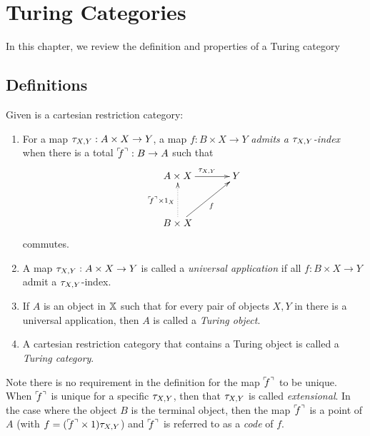\chapter{Turing Categories} %
\label{chap:turing_categories}

In this chapter, we review the definition and properties of a Turing category\cite{cockett-hostra08-intro-to-turing}
\section{Definitions}
\label{sec:turing_category_definitions}


\begin{definition}\label{def:turing_category}
  Given \X is a cartesian restriction category:
  \begin{enumerate}
    \item For a map $\tau_{{X},{Y}}: A \times X \to Y$, a map $f:B\times X \to Y$ \emph{admits a $\tau_{{X},{Y}}$-index}
      when there is a total ${}^\ulcorner\!\!f^\urcorner:B\to A$ such that
      \[
        \xymatrix@C+10pt@R+10pt{
          A\times X \ar[r]^{\txy} & Y \\
          B\times X \ar@{.>}[u]^{\code{f}\times 1_X} \ar[ur]_f
        }
      \]
      commutes.\label{defitem:turing_admit_txy_index}
    \item A map $\tau_{{X},{Y}}: A \times X \to Y$ is called a \emph{universal application} if all
      $f:B\times X \to Y$ admit a $\tau_{{X},{Y}}$-index.\label{defitem:turing_universal_application}
    \item If $A$ is an object in $\mathbb{X}$ such that for every pair of objects $X,Y$ in \X there is
      a universal application, then $A$ is called a \emph{Turing object}.
    \item A cartesian restriction category that contains a Turing object is called a
      \emph{Turing category}.
  \end{enumerate}
\end{definition}

Note there is no requirement in the definition for the map ${}^\ulcorner\!\!f^\urcorner$ to be unique. When ${}^\ulcorner\!\!f^\urcorner$ is unique
for a specific $\tau_{{X},{Y}}$, then that $\tau_{{X},{Y}}$ is called \emph{extensional}. In the case where the object
$B$ is the terminal object, then the map ${}^\ulcorner\!\!f^\urcorner$ is a point of $A$ (with $f = ({}^\ulcorner\!\!f^\urcorner \times 1)\tau_{{X},{Y}}$) and
${}^\ulcorner\!\!f^\urcorner$ is referred to as a \emph{code} of $f$.

